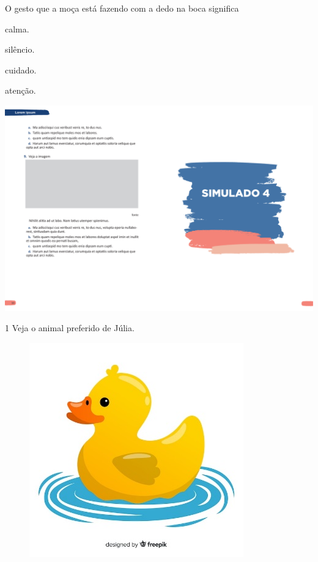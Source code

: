 
O gesto que a moça está fazendo com a dedo na boca significa

\begin{multicols}{2}
\begin{escolha}
\item calma.

\item silêncio.

\item cuidado.

\item atenção.
\end{escolha}
\end{multicols}

\vspace*{-3.4cm}
\hspace*{-3.7cm}\includegraphics[scale=1]{../watermarks/4simulado5ano.pdf}

\num{1} Veja o animal preferido de Júlia.

\begin{figure}[htpb!]
\centering
\includegraphics[width=.4\textwidth]{media/image174.jpeg}
\end{figure}

